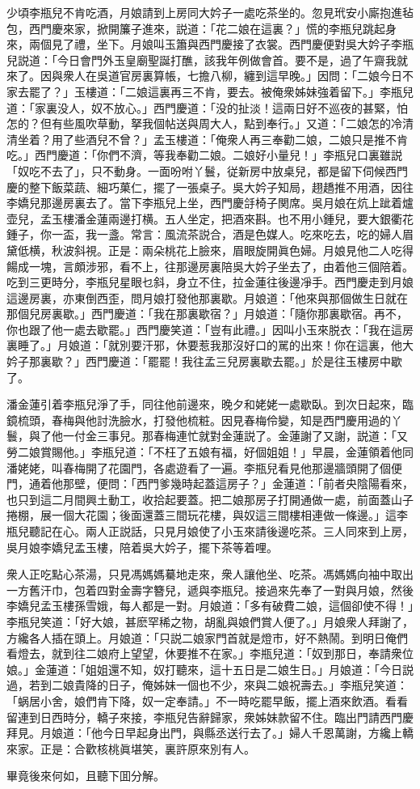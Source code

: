 少頃李瓶兒不肯吃酒，月娘請到上房同大妗子一處吃茶坐的。忽見玳安小廝抱進毡包，西門慶來家，掀開簾子進來，説道：「花二娘在這裏？」慌的李瓶兒跳起身來，兩個見了禮，坐下。月娘叫玉簫與西門慶接了衣裳。西門慶便對吳大妗子李瓶兒説道：「今日會門外玉皇廟聖誕打醮，該我年例做會首。要不是，過了午齋我就來了。因與衆人在吳道官房裏算帳，七擔八柳，纏到這早晚。」因問：「二娘今日不家去罷了？」玉樓道：「二娘這裏再三不肯，要去。被俺衆姊妹強着留下。」李瓶兒道：「家裏没人，奴不放心。」西門慶道：「没的扯淡！這兩日好不巡夜的甚緊，怕怎的？但有些風吹草動，拏我個帖送與周大人，點到奉行。」又道：「二娘怎的冷清清坐着？用了些酒兒不曾？」孟玉樓道：「俺衆人再三奉勸二娘，二娘只是推不肯吃。」西門慶道：「你們不濟，等我奉勸二娘。二娘好小量兒！」李瓶兒口裏雖説「奴吃不去了」，只不動身。一面吩咐丫鬟，従新房中放桌兒，都是留下伺候西門慶的整下飯菜蔬、細巧菓仁，擺了一張桌子。吳大妗子知局，趐趫推不用酒，因往李嬌兒那邊房裏去了。當下李瓶兒上坐，西門慶㧱椅子関席。吳月娘在炕上跐着爐壶兒，孟玉樓潘金蓮兩邊打横。五人坐定，把酒來斟。也不用小鍾兒，要大銀衢花鍾子，你一盃，我一盞。常言：風流茶説合，酒是色媒人。吃來吃去，吃的婦人眉黛低横，秋波斜視。正是：兩朵桃花上臉來，眉眼旋開眞色婦。月娘見他二人吃得餳成一塊，言頗涉邪，看不上，往那邊房裏陪吳大妗子坐去了，由着他三個陪着。吃到三更時分，李瓶兒星眼乜斜，身立不住，拉金蓮往後邊凈手。西門慶走到月娘這邊房裏，亦東倒西歪，問月娘打發他那裏歇。月娘道：「他來與那個做生日就在那個兒房裏歇。」西門慶道：「我在那裏歇宿？」月娘道：「隨你那裏歇宿。再不，你也跟了他一處去歇罷。」西門慶笑道：「豈有此禮。」因叫小玉來脱衣：「我在這房裏睡了。」月娘道：「就別要汗邪，休要惹我那沒好口的駡的出來！你在這裏，他大妗子那裏歇？」西門慶道：「罷罷！我往孟三兒房裏歇去罷。」於是往玉樓房中歇了。

潘金蓮引着李瓶兒淨了手，同往他前邊來，晚夕和姥姥一處歇臥。到次日起來，臨鏡梳頭，春梅與他討洗臉水，打發他梳粧。因見春梅伶變，知是西門慶用過的丫鬟，與了他一付金三事兒。那春梅連忙就對金蓮説了。金蓮謝了又謝，説道：「又勞二娘賞賜他。」李瓶兒道：「不枉了五娘有福，好個姐姐！」早晨，金蓮領着他同潘姥姥，叫春梅開了花園門，各處遊看了一遍。李瓶兒看見他那邊牆頭開了個便門，通着他那壁，便問：「西門爹幾時起蓋這房子？」金蓮道：「前者央陰陽看來，也只到這二月間興土動工，收拾起要蓋。把二娘那房子打開通做一處，前面蓋山子捲棚，展一個大花園；後面還蓋三間玩花樓，與奴這三間樓相連做一條邊。」這李瓶兒聽記在心。兩人正説話，只見月娘使了小玉來請後邊吃茶。三人同來到上房，吳月娘李嬌兒孟玉樓，陪着吳大妗子，擺下茶等着哩。

衆人正吃點心茶湯，只見馮媽媽驀地走來，衆人讓他坐、吃茶。馮媽媽向袖中取出一方舊汗巾，包着四對金壽字簪兒，遞與李瓶兒。接過來先奉了一對與月娘，然後李嬌兒孟玉樓孫雪娥，每人都是一對。月娘道：「多有破費二娘，這個卻使不得！」李瓶兒笑道：「好大娘，甚麽罕稀之物，胡亂與娘們賞人便了。」月娘衆人拜謝了，方纔各人插在頭上。月娘道：「只説二娘家門首就是燈市，好不熱鬧。到明日俺們看燈去，就到往二娘府上望望，休要推不在家。」李瓶兒道：「奴到那日，奉請衆位娘。」金蓮道：「姐姐還不知，奴打聽來，這十五日是二娘生日。」月娘道：「今日説過，若到二娘貴降的日子，俺姊妹一個也不少，來與二娘祝壽去。」李瓶兒笑道：「蜗居小舍，娘們肯下降，奴一定奉請。」不一時吃罷早飯，擺上酒來飲酒。看看留連到日西時分，轎子來接，李瓶兒告辭歸家，衆姊妹款留不住。臨出門請西門慶拜見。月娘道：「他今日早起身出門，與縣丞送行去了。」婦人千恩萬謝，方纔上轎來家。正是：合歡核桃眞堪笑，裏許原來別有人。

畢竟後來何如，且聽下囬分解。

